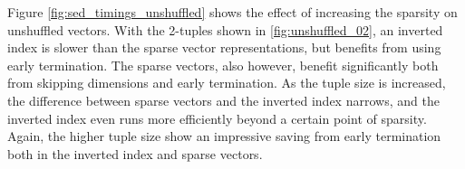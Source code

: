 Figure \ref{fig:sed_timings_unshuffled} shows the effect of increasing the sparsity on unshuffled vectors.  With the 2-tuples shown in \ref{fig:unshuffled_02}, an inverted index is slower than the sparse vector representations, but benefits from using early termination.  The sparse vectors, also however, benefit significantly both from skipping dimensions and early termination.  As the tuple size is increased, the difference between sparse vectors and the inverted index narrows, and the inverted index even runs more efficiently beyond a certain point of sparsity.  Again, the higher tuple size show an impressive saving from early termination both in the inverted index and sparse vectors.   
\begin{figure}
        \centering
        ~ 
        
         
        ~ 
    

\end{figure}

